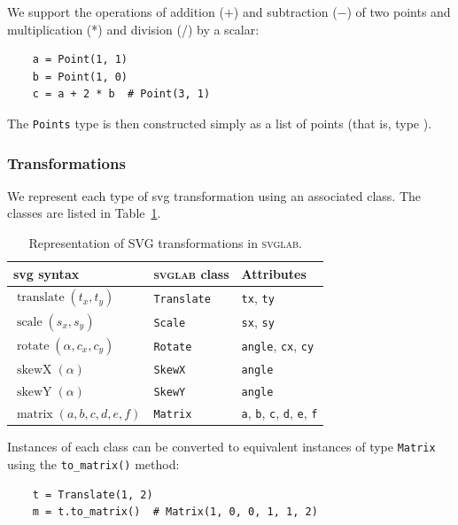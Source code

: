We support the operations of addition ($+$) and subtraction ($-$) of two points and multiplication (*) and division (/) by a scalar:
\begin{verbatim}
    a = Point(1, 1)
    b = Point(1, 0)
    c = a + 2 * b  # Point(3, 1)
\end{verbatim}

The \texttt{Points} type is then constructed simply as a list of points (that is, type ).

\subsubsection{Transformations}

We represent each type of \gls{svg} transformation using an associated class. The classes are listed in Table~\ref{tab:transformation-classes}.

\begin{table}[H]
    \centering
    \begin{tabular}{lll}
    \toprule
    \textbf{\gls{svg} syntax} & \textbf{\textsc{svglab} class} & \textbf{Attributes} \\
    \midrule
    $\operatorname{translate}\left(t_x, t_y\right)$ & \texttt{Translate} & \texttt{tx}, \texttt{ty} \\
    $\operatorname{scale}\left(s_x, s_y\right)$ & \texttt{Scale} & \texttt{sx}, \texttt{sy} \\
    $\operatorname{rotate}\left(\alpha, c_x, c_y\right)$ & \texttt{Rotate} & \texttt{angle}, \texttt{cx}, \texttt{cy} \\
    $\operatorname{skewX}\left(\alpha\right)$ & \texttt{SkewX} & \texttt{angle} \\
    $\operatorname{skewY}\left(\alpha\right)$ & \texttt{SkewY} & \texttt{angle} \\
    $\operatorname{matrix}\left(a, b, c, d, e, f\right)$ & \texttt{Matrix} & \texttt{a}, \texttt{b}, \texttt{c}, \texttt{d}, \texttt{e}, \texttt{f} \\
    \bottomrule
    \end{tabular}
    \caption{Representation of SVG transformations in \textsc{svglab}.}
    \label{tab:transformation-classes}
\end{table}

Instances of each class can be converted to equivalent instances of type \texttt{Matrix} using the \texttt{to\_matrix()} method:
\begin{verbatim}
    t = Translate(1, 2)
    m = t.to_matrix()  # Matrix(1, 0, 0, 1, 1, 2)
\end{verbatim}

